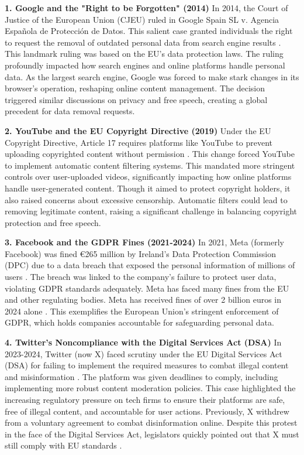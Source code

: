 \textbf{1. Google and the "Right to be Forgotten" (2014)}
In 2014, the Court of Justice of the European Union (CJEU) ruled in Google Spain SL v. Agencia Española de Protección de Datos. This salient case granted individuals the right to request the removal of outdated personal data from search engine results \cite{google2014}. This landmark ruling was based on the EU's data protection laws. The ruling profoundly impacted how search engines and online platforms handle personal data. As the largest search engine, Google was forced to make stark changes in its browser's operation, reshaping online content management. The decision triggered similar discussions on privacy and free speech, creating a global precedent for data removal requests.

\textbf{2. YouTube and the EU Copyright Directive (2019)}
Under the EU Copyright Directive, Article 17 requires platforms like YouTube to prevent uploading copyrighted content without permission \cite{eu2019}. This change forced YouTube to implement automatic content filtering systems. This mandated more stringent controls over user-uploaded videos, significantly impacting how online platforms handle user-generated content. Though it aimed to protect copyright holders, it also raised concerns about excessive censorship. Automatic filters could lead to removing legitimate content, raising a significant challenge in balancing copyright protection and free speech.

\textbf{3. Facebook and the GDPR Fines (2021-2024)}
In 2021, Meta (formerly Facebook) was fined €265 million by Ireland's Data Protection Commission (DPC) due to a data breach that exposed the personal information of millions of users \cite{facebook2023}. The breach was linked to the company's failure to protect user data, violating GDPR standards adequately. Meta has faced many fines from the EU and other regulating bodies. Meta has received fines of over 2 billion euros in 2024 alone \cite{FBFines}. This exemplifies the European Union's stringent enforcement of GDPR, which holds companies accountable for safeguarding personal data. 

\textbf{4. Twitter's Noncompliance with the Digital Services Act (DSA)}
In 2023-2024, Twitter (now X) faced scrutiny under the EU Digital Services Act (DSA) for failing to implement the required measures to combat illegal content and misinformation \cite{twitter2023}. The platform was given deadlines to comply, including implementing more robust content moderation policies. This case highlighted the increasing regulatory pressure on tech firms to ensure their platforms are safe, free of illegal content, and accountable for user actions. Previously, X withdrew from a voluntary agreement to combat disinformation online. Despite this protest in the face of the Digital Services Act, legislators quickly pointed out that X must still comply with EU standards \cite{bhr2023}.

